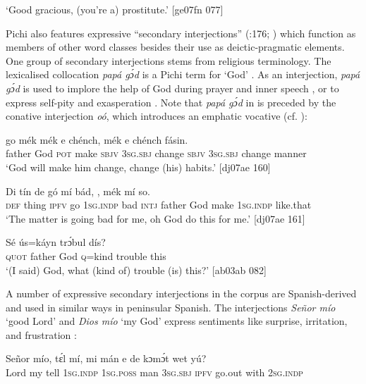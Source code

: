 \glt ‘Good gracious, (you’re a) prostitute.’ [ge07fn 077]
\z

Pichi also features expressive “secondary interjections” (\citealt{Bloomfield1935}:176; \citealt{Ameka1992a}) which function as members of other word classes besides their use as deictic-pragmatic elements. One group of secondary interjections stems from religious terminology. The lexicalised collocation \textit{papá gɔ́d} is a Pichi term for ‘God’ . As an interjection,\textit{ papá gɔ́d} is used to implore the help of God during prayer and inner speech , or to express self-pity and exasperation . Note that \textit{papá gɔ́d} in  is preceded by the conative interjection \textit{oó}, which introduces an emphatic vocative (cf. ):


\ea%
    \label{ex:key:1640}
    \gll {}    go  mék    mék  e    chénch,  mék  e    chénch  fásin.\\
father  God  \textsc{pot}  make  \textsc{sbjv}  \textsc{3sg.sbj}  change  \textsc{sbjv}  \textsc{3sg.sbj}  change  manner\\
\glt ‘God will make him change, change (his) habits.’ [dj07ae 160]
\z


\ea%
    \label{ex:key:1641}
    \gll Di  tín    de  gó  mí    bád,    ,  
mék    mí    so.\\
\textsc{def}  thing  \textsc{ipfv}  go  \textsc{1sg.indp}  bad    \textsc{intj}  father  God  
make  \textsc{1sg.indp}  like.that\\
\glt ‘The matter is going bad for me, oh God do this for me.’ [dj07ae 161]
\z

\ea%
    \label{ex:key:1642}
    \gll Sé      ús=káyn  trɔ́bul  dís?\\
\textsc{quot}    father  God  \textsc{q}=kind  trouble  this\\

\glt ‘(I said) God, what (kind of) trouble (is) this?’ [ab03ab 082]
\z

A number of expressive secondary interjections in the corpus are Spanish-derived and used in similar ways in peninsular Spanish. The interjections \textit{Señor mío} ‘good Lord’ and \textit{Dios mío} ‘my God’ express sentiments like surprise, irritation, and frustration :


\ea%
    \label{ex:key:1643}
    \gll Señor  mío,  tɛ́l  mí,    mi    mán
e    de  kɔmɔ́t  wet    yú?\\
Lord  my    tell  \textsc{1sg.indp}  \textsc{1sg.poss}  man
\textsc{3sg.sbj}  \textsc{ipfv}  go.out  with    \textsc{2sg.indp}\\

